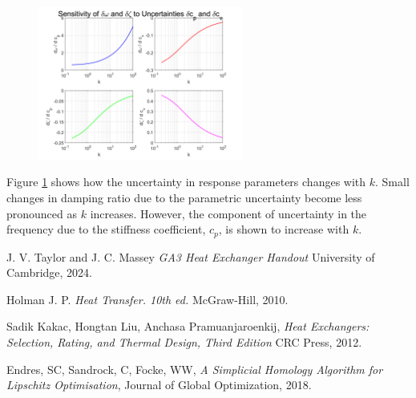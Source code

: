 \documentclass{article}
\begin{document}
\begin{figure}[H]
    \centering
    \includegraphics[width=0.6\textwidth]{figures/u_propagation.png}
    \caption{}
    \label{fig:u_propagation}
\end{figure}
Figure \ref{fig:u_propagation} shows how the uncertainty in response parameters changes with $k$.
Small changes in damping ratio due to the parametric uncertainty become less pronounced as $k$ increases.
However, the component of uncertainty in the frequency due to the stiffness coefficient, $c_p$, is shown to increase with $k$.

\begin{thebibliography}{9}

    
      J. V. Taylor and J. C. Massey
      \emph{GA3 Heat Exchanger Handout}
      University of Cambridge,
      2024.
    
      Holman J. P.
      \emph{Heat Transfer. 10th ed.}
      McGraw-Hill,
      2010.
    
      Sadik Kakac, Hongtan Liu, Anchasa Pramuanjaroenkij,
      \emph{Heat Exchangers: Selection, Rating, and Thermal Design, Third Edition}
      CRC Press,
      2012.
    
      Endres, SC, Sandrock, C, Focke, WW,
      \emph{A Simplicial Homology Algorithm for Lipschitz Optimisation},
      Journal of Global Optimization,
      2018.
    
\end{thebibliography}
\end{document}
